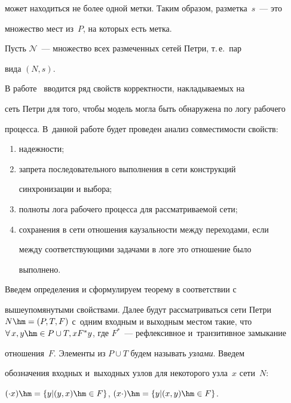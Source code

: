 может находиться не более одной метки. Таким образом, разметка~$s$~---  это 

множество мест из~$P$, на которых есть метка. 

  

  Пусть $\mathcal{N}$~--- множество всех размеченных сетей Петри, т.\,е.\ пар 

вида $(N,s)$.

  

  В работе~\cite{5-tg} вводится ряд свойств корректности, накладываемых на 

сеть Петри для того, чтобы модель могла быть обнаружена по логу рабочего 

процесса. В~данной работе будет проведен анализ совместимости свойств:

  \begin{enumerate}[(1)]

\item надежности;

\item запрета последовательного выполнения в сети конструкций 

синхронизации и выбора;

\item полноты лога рабочего процесса для рассматриваемой сети;

\item сохранения в сети отношения каузальности между переходами, если 

между соответствующими задачами в логе это отношение было 

выполнено. 

\end{enumerate}



  Введем определения и сформулируем теорему в соответствии с 

вышеупомянутыми свойствами. Далее будут рассматриваться сети Петри $N\hm= 

(P,T,F)$ с~одним входным и выходным местом такие, что $\forall\, x,y\hm\in P\cup 

T, xF^* y$, где $F^*$~--- рефлексивное и~транзитивное замыкание 

отношения~$F$. Элементы из $P\cup T$ будем называть \textit{узлами}. Введем 

обозначения входных и~выходных узлов для некоторого узла~$x$ сети~$N$: 

$(\cdot x)\hm= \{ y\vert (y,x)\hm\in F\}$, $(x\cdot)\hm= \{ y\vert (x,y)\hm\in F\}$.

